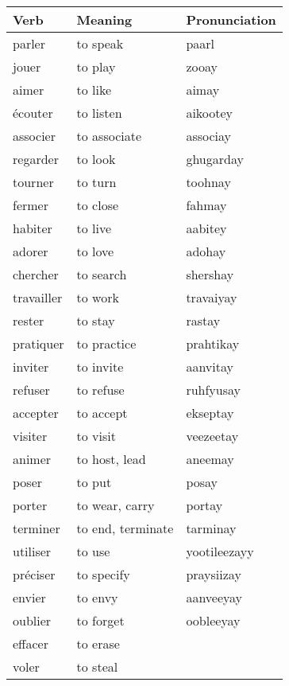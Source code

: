 \begin{longtable}{| l | l | l |}
\hline
Verb 		& Meaning 		& Pronunciation	\\
\hline
\endhead
parler		& to speak		& paarl			\\ 	\hline
jouer		& to play		& zooay			\\	\hline
aimer		& to like		& aimay			\\	\hline
\'ecouter	& to listen		& aikootey		\\	\hline
associer	& to associate	& associay		\\	\hline
regarder	& to look		& ghugarday		\\	\hline
tourner		& to turn		& toohnay		\\	\hline
fermer		& to close		& fahmay		\\	\hline
habiter		& to live		& aabitey		\\	\hline
adorer 		& to love		& adohay		\\	\hline
chercher	& to search		& shershay		\\	\hline
travailler	& to work		& travaiyay		\\	\hline
rester      & to stay       & rastay        \\  \hline
pratiquer   & to practice   & prahtikay     \\  \hline
inviter     & to invite     & aanvitay      \\  \hline
refuser     & to refuse     & ruhfyusay     \\  \hline
accepter    & to accept     & ekseptay      \\  \hline
visiter     & to visit      & veezeetay     \\  \hline
animer      & to host, lead & aneemay       \\  \hline
poser       & to put        & posay         \\  \hline
porter      & to wear, carry& portay        \\  \hline
terminer    & to end, terminate & tarminay  \\  \hline
utiliser    & to use        & yootileezayy  \\  \hline
pr\'eciser  & to specify    & praysiizay    \\  \hline
envier      & to envy       & aanveeyay     \\  \hline
oublier     & to forget     & oobleeyay     \\  \hline
effacer     & to erase & \\ \hline
voler       & to steal & \\ \hline
\end{longtable}

